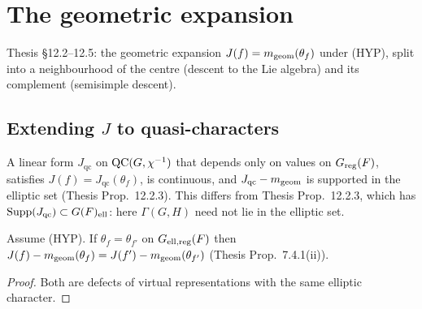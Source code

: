 \chapter{The geometric expansion}
\label{chap:geometric}
Thesis \S12.2--12.5: the geometric expansion $J(f)=m_{\mathrm{geom}}(\theta_f)$ under (HYP), split into a neighbourhood
of the centre (descent to the Lie algebra) and its complement (semisimple descent).

\section{\texorpdfstring{Extending $J$ to quasi-characters}{Extending J to quasi-characters}}
\begin{definition}
\label{IsJqc}
\leanok
{}
A linear form $J_{\mathrm{qc}}$ on $\mathrm{QC}(G,\chi^{-1})$ that depends only on values on $G_{\mathrm{reg}}(F)$, satisfies
$J(f)=J_{\mathrm{qc}}(\theta_f)$, is continuous, and $J_{\mathrm{qc}}-m_{\mathrm{geom}}$ is supported in the elliptic set
(Thesis Prop.~12.2.3). This differs from Thesis Prop.~12.2.3, which has $\mathrm{Supp}(J_{\mathrm{qc}})\subset G(F)_{\mathrm{ell}}$:
here $\Gamma(G,H)$ need not lie in the elliptic set.
\end{definition}

\begin{lemma}
\label{distribJ_sub_mGeom_eq_of_eqOn_ell}
\leanok
{}
Assume (HYP). If $\theta_f=\theta_{f'}$ on $G_{\mathrm{ell,reg}}(F)$ then $J(f)-m_{\mathrm{geom}}(\theta_f)=J(f')-m_{\mathrm{geom}}(\theta_{f'})$
(Thesis Prop.~7.4.1(ii)).
\end{lemma}
\begin{proof}
\leanok
{}
Both are defects of virtual representations with the same elliptic character.
\end{proof}

